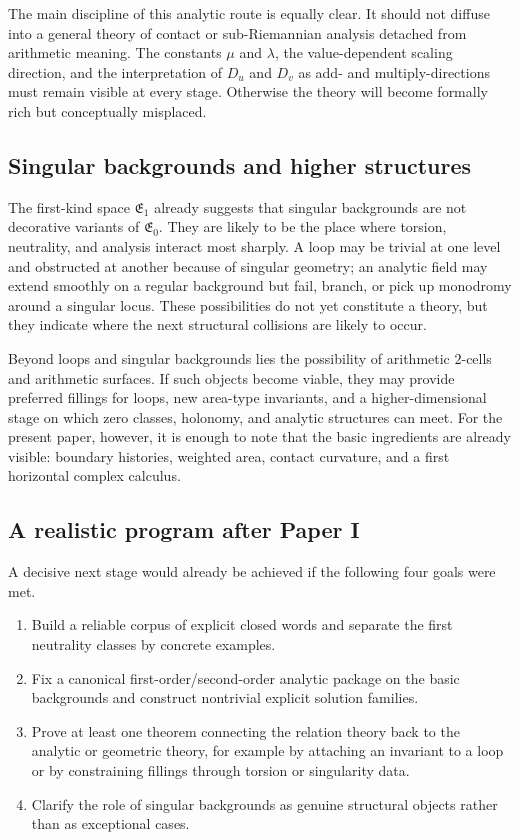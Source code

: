 The main discipline of this analytic route is equally clear. It should not diffuse into a general theory of contact or sub-Riemannian analysis detached from arithmetic meaning. The constants $\mu$ and $\lambda$, the value-dependent scaling direction, and the interpretation of $D_u$ and $D_v$ as add- and multiply-directions must remain visible at every stage. Otherwise the theory will become formally rich but conceptually misplaced.

\subsection{Singular backgrounds and higher structures}

The first-kind space $\mathfrak{E}_1$ already suggests that singular backgrounds are not decorative variants of $\mathfrak{E}_0$. They are likely to be the place where torsion, neutrality, and analysis interact most sharply. A loop may be trivial at one level and obstructed at another because of singular geometry; an analytic field may extend smoothly on a regular background but fail, branch, or pick up monodromy around a singular locus. These possibilities do not yet constitute a theory, but they indicate where the next structural collisions are likely to occur.

Beyond loops and singular backgrounds lies the possibility of arithmetic $2$-cells and arithmetic surfaces. If such objects become viable, they may provide preferred fillings for loops, new area-type invariants, and a higher-dimensional stage on which zero classes, holonomy, and analytic structures can meet. For the present paper, however, it is enough to note that the basic ingredients are already visible: boundary histories, weighted area, contact curvature, and a first horizontal complex calculus.

\subsection{A realistic program after Paper I}

A decisive next stage would already be achieved if the following four goals were met.

\begin{enumerate}
    \item Build a reliable corpus of explicit closed words and separate the first neutrality classes by concrete examples.
    \item Fix a canonical first-order/second-order analytic package on the basic backgrounds and construct nontrivial explicit solution families.
    \item Prove at least one theorem connecting the relation theory back to the analytic or geometric theory, for example by attaching an invariant to a loop or by constraining fillings through torsion or singularity data.
    \item Clarify the role of singular backgrounds as genuine structural objects rather than as exceptional cases.
\end{enumerate}


